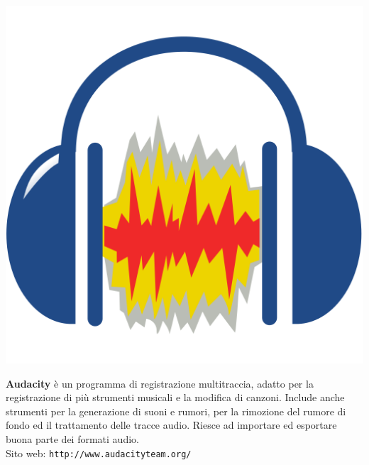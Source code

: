 \documentclass[a4paper, 12pt]{extarticle}
\begin{document}
\begin{minipage}{.2\linewidth}
    \includegraphics[width=.9\linewidth]{img/opuscolo-13.png}
\end{minipage}
\begin{minipage}{.75\linewidth}
\textbf{Audacity} è un programma di registrazione multitraccia, adatto per la registrazione di più strumenti musicali e
la modifica di canzoni. Include anche strumenti per la generazione di suoni e rumori,
per la rimozione del rumore di fondo ed il trattamento delle tracce audio.
Riesce ad importare ed esportare buona parte dei formati audio.\\
Sito web: \texttt{http://www.audacityteam.org/}
\end{minipage}
\end{document}
